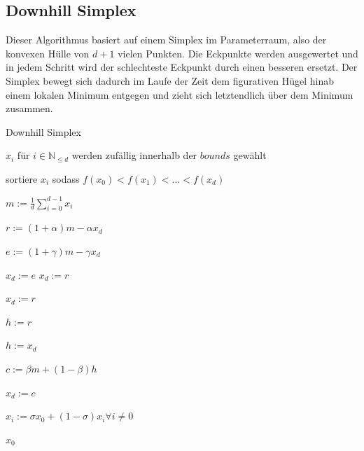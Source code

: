 \documentclass[a4paper,12pt]{article}
\begin{document}





\subsection{Downhill Simplex}

Dieser Algorithmus basiert auf einem Simplex im Parameterraum, also der konvexen Hülle von $d+1$ vielen Punkten. Die Eckpunkte werden ausgewertet und in jedem Schritt wird der schlechteste Eckpunkt durch einen besseren ersetzt. Der Simplex bewegt sich dadurch im Laufe der Zeit dem figurativen Hügel hinab einem lokalen Minimum entgegen und zieht sich letztendlich über dem Minimum zusammen.

\begin{algorithm}
\caption{Downhill Simplex}
\begin{algorithmic}

\State $x_i$ für $i \in \mathbb{N}_{\leq d}$ werden zufällig innerhalb der $bounds$ gewählt


\State sortiere $x_i$ sodass $f(x_0) < f(x_1) < \hdots < f(x_d)$

\State $m := \frac{1}{d} \sum^{d-1}_{i = 0} x_i$ 

\State $r := (1+\alpha)m - \alpha x_d$ 


\State $e := (1+\gamma)m - \gamma x_d$ 

\State $x_d := e$
\Else
\State $x_d := r$
\EndIf

\State $x_d := r$
\Else

\State $h := r$

\Else
\State $h := x_d$

\EndIf

\State $c := \beta m  + (1-\beta) h$


\State $x_d := c$ 

\Else

\State $x_i := \sigma x_0 + (1-\sigma) x_i \forall i \neq 0$ 

\EndIf

\EndIf

\EndFor

\Return $x_0$
\EndFunction	
\end{algorithmic}
\end{algorithm}
\end{document}
